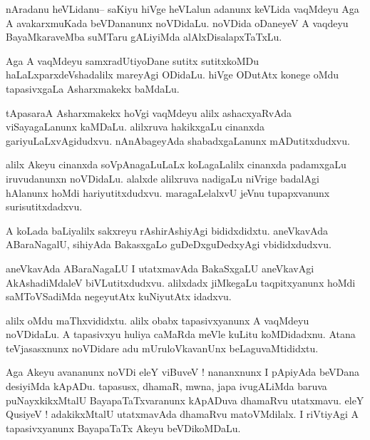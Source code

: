 \documentclass{article}
\begin{document}
\begin{mn}%
nAradanu heVLidanu-- saKiyu hiVge heVLalun adanunx keVLida vaqMdeyu Aga A avakarxmuKada 
beVDananunx noVDidaLu. noVDida oDaneyeV A vaqdeyu BayaMkaraveMba suMTaru gALiyiMda 
alAlxDisalapxTaTxLu.
\end{mn}

\begin{mn}%
Aga A vaqMdeyu samxradUtiyoDane sutitx sutitxkoMDu haLaLxparxdeVshadalilx mareyAgi ODidaLu. 
hiVge ODutAtx konege oMdu tapasivxgaLa Asharxmakekx baMdaLu.
\end{mn}

\begin{mn}%
tApasaraA Asharxmakekx hoVgi vaqMdeyu alilx ashacxyaRvAda viSayagaLanunx kaMDaLu. alilxruva 
hakikxgaLu cinanxda gariyuLaLxvAgidudxvu. nAnAbageyAda shabadxgaLanunx mADutitxdudxvu.
\end{mn}

\begin{mn}%
alilx Akeyu cinanxda soVpAnagaLuLaLx koLagaLalilx cinanxda padamxgaLu iruvudanunxn 
noVDidaLu. alalxde alilxruva nadigaLu niVrige badalAgi hAlanunx hoMdi hariyutitxdudxvu. 
maragaLelalxvU jeVnu tupapxvanunx surisutitxdadxvu.
\end{mn}

\begin{mn}%
A koLada baLiyalilx sakxreyu rAshirAshiyAgi bididxdidxtu. aneVkavAda ABaraNagalU, sihiyAda 
BakasxgaLo guDeDxguDedxyAgi vbididxdudxvu.
\end{mn}

\begin{mn}%
aneVkavAda ABaraNagaLU I utatxmavAda BakaSxgaLU aneVkavAgi AkAshadiMdaleV biVLutitxdudxvu. 
alilxdadx jiMkegaLu taqpitxyanunx hoMdi saMToVSadiMda negeyutAtx kuNiyutAtx idadxvu.
\end{mn}

\begin{mn}%
alilx oMdu maThxvididxtu. alilx obabx tapasivxyanunx A vaqMdeyu noVDidaLu. A tapasivxyu 
huliya caMaRda meVle kuLitu koMDidadxnu. Atana teVjasasxnunx noVDidare adu mUruloVkavanUnx 
beLaguvaMtididxtu.
\end{mn}

\begin{mn}%
Aga Akeyu avananunx noVDi eleY viBuveV ! nananxnunx I pApiyAda beVDana desiyiMda kApADu. 
tapasusx, dhamaR, mwna, japa ivugALiMda baruva puNayxkikxMtalU BayapaTaTxvaranunx kApADuva 
dhamaRvu utatxmavu. eleY QusiyeV ! adakikxMtalU utatxmavAda dhamaRvu matoVMdilalx. I 
riVtiyAgi A tapasivxyanunx BayapaTaTx Akeyu beVDikoMDaLu.
\end{mn}
\end{document}

